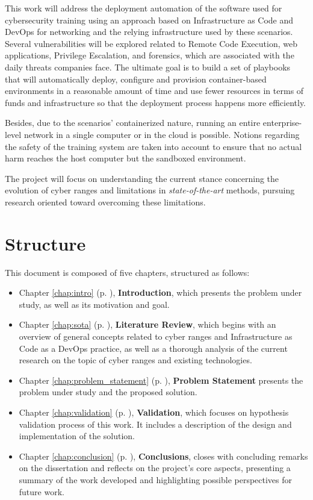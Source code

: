 This work will address the deployment automation of the software used for cybersecurity training using an approach based on Infrastructure as Code and DevOps for networking and the relying infrastructure used by these scenarios. Several vulnerabilities will be explored related to Remote Code Execution, web applications, Privilege Escalation, and forensics, which are associated with the daily threats companies face. The ultimate goal is to build a set of playbooks that will automatically deploy, configure and provision container-based environments in a reasonable amount of time and use fewer resources in terms of funds and infrastructure so that the deployment process happens more efficiently. 

Besides, due to the scenarios' containerized nature, running an entire enterprise-level network in a single computer or in the cloud is possible. Notions regarding the safety of the training system are taken into account to ensure that no actual harm reaches the host computer but the sandboxed environment. 

The project will focus on understanding the current stance concerning the evolution of cyber ranges and limitations in \textit{state-of-the-art} methods, pursuing research oriented toward overcoming these limitations.

\section{Structure} \label{sec:structure}

This document is composed of five chapters, structured as follows:

\begin{itemize}
    \item Chapter \ref{chap:intro} (p. \pageref{chap:intro}), \textbf{Introduction}, which presents the problem under study, as well as its motivation
and goal.
    \item Chapter \ref{chap:sota} (p. \pageref{chap:sota}), \textbf{Literature Review}, which begins with an overview of general concepts related to cyber ranges and Infrastructure as Code as a DevOps practice, as well as a thorough analysis of the current research on the topic of cyber ranges and existing technologies.
    \item Chapter \ref{chap:problem_statement} (p. \pageref{chap:problem_statement}), \textbf{Problem Statement} presents the problem under study and the proposed solution.
    \item Chapter \ref{chap:validation} (p. \pageref{chap:validation}), \textbf{Validation}, which focuses on hypothesis validation process of this work. It includes a description of the design and implementation of the solution.
    \item Chapter \ref{chap:conclusion} (p. \pageref{chap:conclusion}), \textbf{Conclusions}, closes with concluding remarks on the dissertation and reflects on the project's core aspects, presenting a summary of the work developed and highlighting possible perspectives for future work.
\end{itemize}